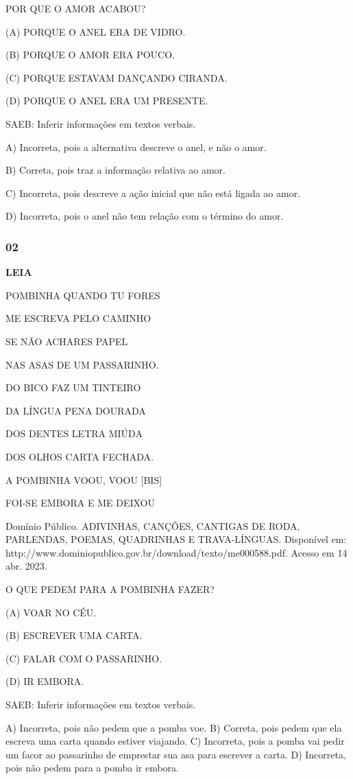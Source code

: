 POR QUE O AMOR ACABOU?

(A) PORQUE O ANEL ERA DE VIDRO.

(B) PORQUE O AMOR ERA POUCO.

(C) PORQUE ESTAVAM DANÇANDO CIRANDA.

(D) PORQUE O ANEL ERA UM PRESENTE.


\protect\hypertarget{_heading=h.49x2ik5}{}{}SAEB: Inferir
informações em textos verbais.

A) Incorreta, pois a alternativa descreve o anel, e não o amor.

B) Correta, pois traz a informação relativa ao amor.

C) Incorreta, pois descreve a ação inicial que não está ligada ao amor.

D) Incorreta, pois o anel não tem relação com o término do amor.

\subsubsection{02}\label{section-21}

\textbf{LEIA}

POMBINHA QUANDO TU FORES

ME ESCREVA PELO CAMINHO

SE NÃO ACHARES PAPEL 

NAS ASAS DE UM PASSARINHO. 

DO BICO FAZ UM TINTEIRO 

DA LÍNGUA PENA DOURADA 

DOS DENTES LETRA MIÚDA

DOS OLHOS CARTA FECHADA. 

A POMBINHA VOOU, VOOU [BIS] 

FOI-SE EMBORA E ME DEIXOU

Domínio Público. ADIVINHAS, CANÇÕES, CANTIGAS DE RODA, PARLENDAS, POEMAS, QUADRINHAS E TRAVA-LÍNGUAS. Disponível em: http://www.dominiopublico.gov.br/download/texto/me000588.pdf. Acesso em 14 abr. 2023.

O QUE PEDEM PARA A POMBINHA FAZER?

(A) VOAR NO CÉU.

(B) ESCREVER UMA CARTA.

(C) FALAR COM O PASSARINHO.

(D) IR EMBORA.

SAEB: Inferir informações em textos verbais.

A) Incorreta, pois não pedem que a pomba voe.
B) Correta, pois pedem que ela escreva uma carta quando estiver viajando.
C) Incorreta, pois a pomba vai pedir um facor ao passarinho de emprestar sua asa para escrever a carta.
D) Incorreta, pois não pedem para a pomba ir embora.


